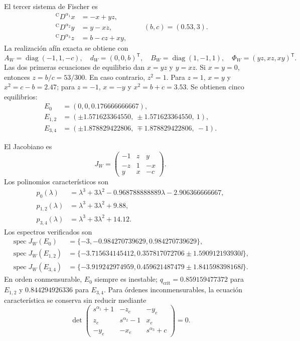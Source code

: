 El tercer sistema de Fischer es
\begin{equation}
\begin{aligned}
 {}^{\mathrm C}D^{\alpha_1}x&=-x+yz,\\
 {}^{\mathrm C}D^{\alpha_2}y&=y-xz,\\
 {}^{\mathrm C}D^{\alpha_3}z&=b-cz+xy,
\end{aligned}
\qquad (b,c)=(0.53,3).
\label{ncbench:eq:fourwing}
\end{equation}
La realización afín exacta se obtiene con
\begin{equation}
 A_W=\operatorname{diag}(-1,1,-c),\quad
 d_W=(0,0,b)^{\mathsf T},\quad
 B_W=\operatorname{diag}(1,-1,1),\quad
 \Phi_W=(yz,xz,xy)^{\mathsf T}.
\end{equation}
Las dos primeras ecuaciones de equilibrio dan \(x=yz\) y \(y=xz\). Si
\(x=y=0\), entonces \(z=b/c=53/300\). En caso contrario, \(z^2=1\). Para
\(z=1\), \(x=y\) y \(x^2=c-b=2.47\); para \(z=-1\), \(x=-y\) y
\(x^2=b+c=3.53\). Se obtienen cinco equilibrios:
\begin{align}
 E_0&=(0,0,0.176666666667),\\
 E_{1,2}&=(\pm1.571623364550,\ \pm1.571623364550,\ 1),\\
 E_{3,4}&=(\pm1.878829422806,\ \mp1.878829422806,\ -1).
\end{align}

El Jacobiano es
\begin{equation}
 J_W=\begin{pmatrix}
 -1&z&y\\-z&1&-x\\y&x&-c
 \end{pmatrix}.
\end{equation}
Los polinomios característicos son
\begin{align}
 p_0(\lambda)&=\lambda^3+3\lambda^2
 -0.968788888889\lambda-2.906366666667,\\
 p_{1,2}(\lambda)&=\lambda^3+3\lambda^2+9.88,\\
 p_{3,4}(\lambda)&=\lambda^3+3\lambda^2+14.12.
\end{align}
Los espectros verificados son
\begin{align}
 \operatorname{spec}J_W(E_0)&=
 \{-3,-0.984270739629,0.984270739629\},\\
 \operatorname{spec}J_W(E_{1,2})&=
 \{-3.715634145412,0.357817072706
 \pm1.590912193930\ii\},\\
 \operatorname{spec}J_W(E_{3,4})&=
 \{-3.919242974959,0.459621487479
 \pm1.841598398168\ii\}.
\end{align}
En orden conmensurable, \(E_0\) siempre es inestable;
\(q_{\mathrm{crit}}=0.859159477372\) para \(E_{1,2}\) y
\(0.844294926336\) para \(E_{3,4}\). Para órdenes inconmensurables, la ecuación
característica se conserva sin reducir mediante
\begin{equation}
 \det\begin{pmatrix}
 s^{\alpha_1}+1&-z_e&-y_e\\
 z_e&s^{\alpha_2}-1&x_e\\
 -y_e&-x_e&s^{\alpha_3}+c
 \end{pmatrix}=0.
\end{equation}

